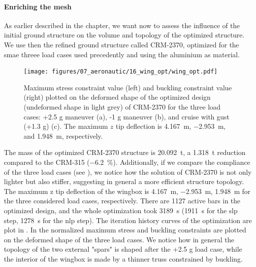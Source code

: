 \paragraph{Enriching the mesh}
As earlier described in the chapter, we want now to assess the influence of the initial ground structure on the volume and topology of the optimized structure. We use then the refined ground structure called CRM-2370, optimized for the smae threee load cases used precedently and using the aluminium as material.

\begin{figure}
    \centering
    \texttt{[image: figures/07\_aeronautic/16\_wing\_opt/wing\_opt.pdf]}
     \caption{Maximum stress constraint value (left) and buckling constraint value (right) plotted on the deformed shape of the optimized design (undeformed shape in light grey) of CRM-2370 for the three load cases: +2.5 g maneuver (a), -1 g maneuver (b), and cruise with gust (+1.3 g) (c). The maximum $z$ tip deflection is \qty{4.167}{m}, \qty{-2.953}{m}, and \qty{1.948}{m}, respectively.}
    \label{fig:07_wing_opt}
\end{figure}
The mass of the optimized CRM-2370 structure is \qty{20.092}{\tonne}, a \qty{1.318}{\tonne} reduction compared to the CRM-315 (\qty{-6.2}{\%}). Additionally, if we compare the compliance of the three load cases (see ), we notice how the solution of CRM-2370 is not only lighter but also stiffer, suggesting in general a more efficient structure topology. The maximum  z tip deflection of the wingbox is \qty{4.167}{m}, \qty{-2.953}{m}, \qty{1.948}{m} for the three considered load cases, respectively. There are 1127 active bars in the optimized design, and the whole optimization took \qty{3189}{s} (\qty{1911}{s} for the \gls{slp} step, \qty{1278}{s} for the \gls{nlp} step). The iteration history curves of the optimization are plot in . In  the normalized maximum stress and buckling constraints are plotted on the deformed shape of the three load cases. We notice how in general the topology of the two external "spars" is shaped after the +2.5 g load case, while the interior of the wingbox is made by a thinner truss constrained by buckling. 

